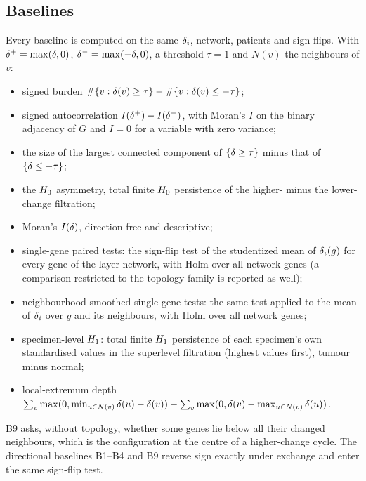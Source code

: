 \subsection{Baselines}\label{sec:baselines}
Every baseline is computed on the same $\delta_i$, network, patients and sign flips. With $\delta^{+}=\max(\delta,0)$, $\delta^{-}=\max(-\delta,0)$, a threshold $\tau=1$ and $N(v)$ the neighbours of $v$:
\begin{itemize}
\item[B1] signed burden $\#\{v:\delta(v)\ge\tau\}-\#\{v:\delta(v)\le-\tau\}$;
\item[B2] signed autocorrelation $I(\delta^{+})-I(\delta^{-})$, with Moran's $I$ \citep{moran1950} on the binary adjacency of $G$ and $I=0$ for a variable with zero variance;
\item[B3] the size of the largest connected component of $\{\delta\ge\tau\}$ minus that of $\{\delta\le-\tau\}$;
\item[B4] the $H_{0}$ asymmetry, total finite $H_{0}$ persistence of the higher- minus the lower-change filtration;
\item[B5] Moran's $I(\delta)$, direction-free and descriptive;
\item[B6] single-gene paired tests: the sign-flip test of the studentized mean of $\delta_i(g)$ for every gene of the layer network, with Holm over all network genes (a comparison restricted to the topology family is reported as well);
\item[B7] neighbourhood-smoothed single-gene tests: the same test applied to the mean of $\delta_i$ over $g$ and its neighbours, with Holm over all network genes;
\item[B8] specimen-level $H_{1}$: total finite $H_{1}$ persistence of each specimen's own standardised values in the superlevel filtration (highest values first), tumour minus normal;
\item[B9] local-extremum depth $\sum_v\max(0,\min_{u\in N(v)}\delta(u)-\delta(v))-\sum_v\max(0,\delta(v)-\max_{u\in N(v)}\delta(u))$.
\end{itemize}
B9 asks, without topology, whether some genes lie below all their changed neighbours, which is the configuration at the centre of a higher-change cycle. The directional baselines B1--B4 and B9 reverse sign exactly under exchange and enter the same sign-flip test.

